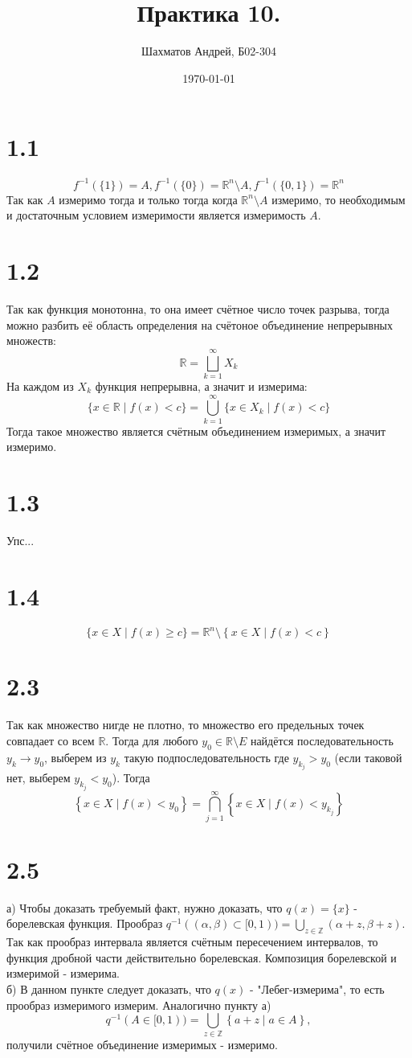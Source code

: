 \documentclass[12pt]{article}
\title{Практика 10.}
\author{Шахматов Андрей, Б02-304}
\date{\today}
\begin{document}
\maketitle
\tableofcontents

\section{1.1}
\[
    f^{-1} (\{1\}) = A, f^{-1}(\{0\}) = \mathbb{R}^n \setminus A, f^{-1}(\{0, 1\}) = \mathbb{R}^n 
\]
Так как $A$ измеримо тогда и только тогда когда $\mathbb{R}^n \setminus A$ измеримо, то 
необходимым и достаточным условием измеримости является измеримость $A$. 
\section{1.2}
Так как функция монотонна, то она имеет счётное число точек разрыва, тогда можно разбить 
её область определения на счётоное объединение непрерывных множеств: 
\[
    \mathbb{R} = \bigsqcup_{k = 1}^{\infty} X_k
\]   
На каждом из $X_k$ функция непрерывна, а значит и измерима: 
\[
    \{x \in \mathbb{R} \mid f(x) < c\} = \bigcup_{k=1}^{\infty} \{{x \in X_k \mid f(x) < c}\}
\] 
Тогда такое множество является счётным объединением измеримых, а значит измеримо.
\section{1.3}
Упс...
\section{1.4}
\[
    \{x \in X \mid f(x) \geq c \} = \mathbb{R}^n \setminus \left\{ x \in X \mid f(x) < c \right\}  
\] 
\section{2.3}
Так как множество нигде не плотно, то множество его предельных точек совпадает со всем $\mathbb{R}$. 
Тогда для любого $y_0 \in \mathbb{R} \setminus E$ найдётся последовательность $y_k \to y_0$, выберем из 
$y_k$ такую подпоследовательность где $y_{k_j} > y_0$ (если таковой нет, выберем $y_{k_j} < y_0$). 
Тогда
\[
    \left\{ x \in X \mid f(x) < y_0 \right\} = \bigcap_{j = 1}^{\infty} \left\{ x \in X \mid f(x) < y_{k_j} \right\}
\]
\section{2.5}
а) 
Чтобы доказать требуемый факт, нужно доказать, что $q(x) = \{x\}$ - борелевская функция. 
Прообраз $q^{-1}((\alpha, \beta) \subset [0, 1)) = \bigcup_{z \in \mathbb{Z}} (\alpha + z, \beta + z)$. 
Так как прообраз интервала является счётным пересечением интервалов, то функция дробной части действительно 
борелевская. Композиция борелевской и измеримой - измерима.
\\ б) 
В данном пункте следует доказать, что $q(x)$ - "Лебег-измерима", то есть прообраз измеримого измерим. 
Аналогично пункту а) 
\[
    q^{-1} (A \in [0, 1)) = \bigcup_{z \in \mathbb{Z}} \left\{ a + z \mid a \in A \right\},   
\]
получили счётное объединение измеримых - измеримо.
\end{document}
